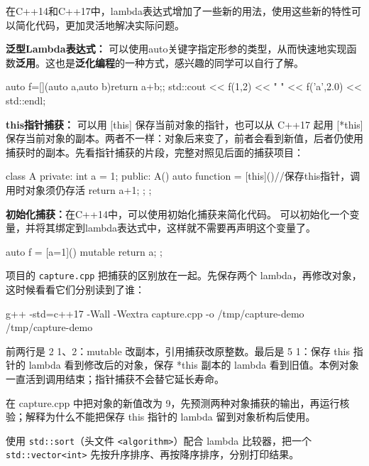 在C++14和C++17中，lambda表达式增加了一些新的用法，使用这些新的特性可以简化代码，更加灵活地解决实际问题。

\textbf{泛型Lambda表达式：}
可以使用auto关键字指定形参的类型，从而快速地实现函数\textbf{泛用}。这也是\textbf{泛化编程}的一种方式，感兴趣的同学可以自行了解。
\begin{tcode}
auto f=[](auto a,auto b){return a+b;};
std::cout << f(1,2) << " " << f('a',2.0) << std::endl;
\end{tcode}

\textbf{this指针捕获：}
可以用 [this] 保存当前对象的指针，也可以从 C++17 起用 [*this] 保存当前对象的副本。两者不一样：对象后来变了，前者会看到新值，后者仍使用捕获时的副本。先看指针捕获的片段，完整对照见后面的捕获项目：
\begin{tcode}
class A{
private:
    int a = 1;
public:
    A(){
        auto function = [this](){//保存this指针，调用时对象须仍存活
            return a+1;
        };
    }
};
\end{tcode}

\textbf{初始化捕获：}在C++14中，可以使用初始化捕获来简化代码。
可以初始化一个变量，并将其绑定到lambda表达式中，这样就不需要再声明这个变量了。

\begin{tcode}
auto f = [a=1]() mutable {
    return a;
};
\end{tcode}


\begin{example}
项目的 \texttt{capture.cpp} 把捕获的区别放在一起。先保存两个 lambda，再修改对象，这时候看看它们分别读到了谁：

\begin{tbash}
g++ -std=c++17 -Wall -Wextra capture.cpp -o /tmp/capture-demo
/tmp/capture-demo
\end{tbash}
前两行是 2 1、2：mutable 改副本，引用捕获改原整数。最后是 5 1：保存 this 指针的 lambda 看到修改后的对象，保存 *this 副本的 lambda 看到旧值。本例对象一直活到调用结束；指针捕获不会替它延长寿命。
\end{example}
\begin{exercise}
\label{ex:v1-cpp-capture}
在 capture.cpp 中把对象的新值改为 9，先预测两种对象捕获的输出，再运行核验；解释为什么不能把保存 this 指针的 lambda 留到对象析构后使用。
\end{exercise}
\begin{exercise}\label{ex:v1-cpp-sort}

使用 \texttt{std::sort}（头文件 \texttt{<algorithm>}）配合 lambda 比较器，把一个 \texttt{std::vector<int>}
先按升序排序、再按降序排序，分别打印结果。
\end{exercise}

